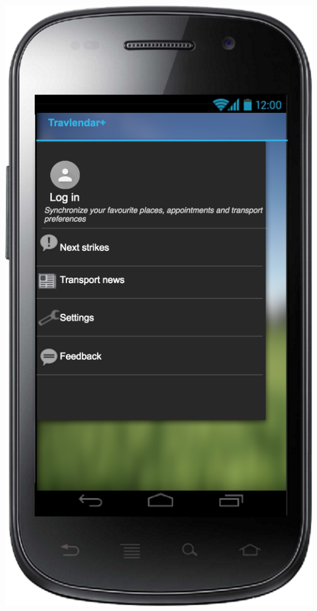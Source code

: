 \documentclass[a4paper,leqno]{article}
\begin{document}
\begin{minipage}[!b]{.5\linewidth}
	\begin{center}
	\includegraphics[scale = 0.15]{Menu.png}
	\end{center}
\end{minipage}
\end{document}
